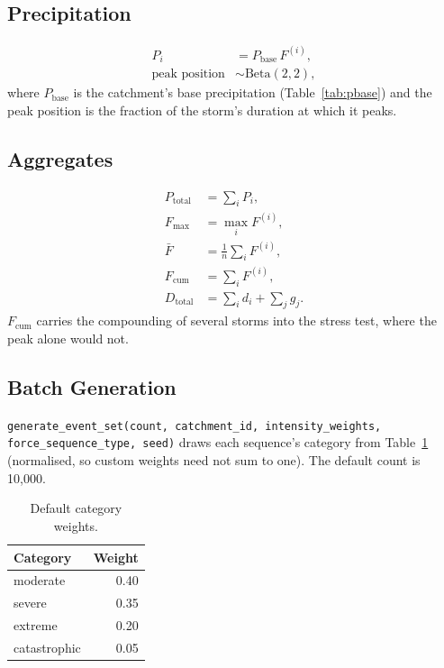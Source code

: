 \documentclass[11pt,a4paper]{article}
\begin{document}
\subsection{Precipitation}
\begin{align}
    P_i &= P_{\text{base}}\, F^{(i)}, \label{eq:precip}\\
    \text{peak position} &\sim \text{Beta}(2, 2), \label{eq:peak}
\end{align}
where $P_{\text{base}}$ is the catchment's base precipitation (Table~\ref{tab:pbase}) and the
peak position is the fraction of the storm's duration at which it peaks.

\subsection{Aggregates}
\begin{align}
    P_{\text{total}} &= \textstyle\sum_i P_i, \label{eq:ptot}\\
    F_{\max} &= \max_i F^{(i)}, \label{eq:fmax}\\
    \bar F &= \tfrac{1}{n}\textstyle\sum_i F^{(i)}, \label{eq:fbar}\\
    F_{\text{cum}} &= \textstyle\sum_i F^{(i)}, \label{eq:fcum}\\
    D_{\text{total}} &= \textstyle\sum_i d_i + \sum_j g_j. \label{eq:dtot}
\end{align}
$F_{\text{cum}}$ carries the compounding of several storms into the stress test, where the
peak alone would not.

\mkminputs

\subsection{Batch Generation}
\texttt{generate\_event\_set(count, catchment\_id, intensity\_weights, force\_sequence\_type,
seed)} draws each sequence's category from Table~\ref{tab:weights} (normalised, so custom
weights need not sum to one). The default count is 10{,}000.
\begin{table}[H]
\centering\small
\caption{Default category weights.}\label{tab:weights}
\begin{tabular}{lr}
\toprule
Category & Weight \\
\midrule
moderate & 0.40 \\ severe & 0.35 \\ extreme & 0.20 \\ catastrophic & 0.05 \\
\bottomrule
\end{tabular}
\end{table}
\end{document}
